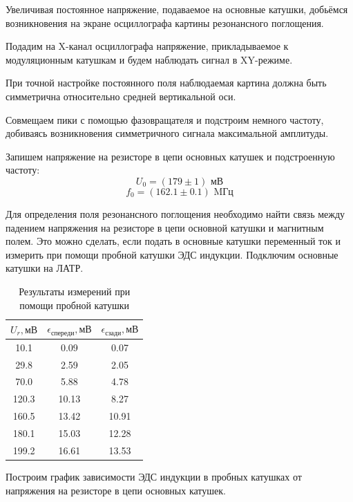\documentclass[a4paper, 12pt]{article}
\begin{document}
        Увеличивая постоянное напряжение, подаваемое на основные катушки, добьёмся возникновения на экране осциллографа картины резонансного поглощения.

        Подадим на X-канал осциллографа напряжение, прикладываемое к модуляционным катушкам и будем наблюдать сигнал в XY-режиме.

        При точной настройке постоянного поля наблюдаемая картина должна быть симметрична относительно средней вертикальной оси.

        Совмещаем пики с помощью фазовращателя и подстроим немного частоту, добиваясь возникновения симметричного сигнала максимальной амплитуды.

        Запишем напряжение на резисторе в цепи основных катушек и подстроенную частоту:
        \[ U_0 = (179 \pm 1) \text{ мВ} \]
        \[ f_0 = (162.1 \pm 0.1) \text{ MГц} \]

        Для определения поля резонансного поглощения необходимо найти связь между падением напряжения на резисторе в цепи основной катушки и магнитным полем.
        Это можно сделать, если подать в основные катушки переменный ток и измерить при помощи пробной катушки ЭДС индукции. Подключим основные катушки на ЛАТР.

        \begin{table}[!ht]
            \centering
            \begin{tabular}{|c|c|c|}
                \hline

                $U_r, мВ$ & $\epsilon_{спереди}, мВ$ & $\epsilon_{сзади}, мВ$\\ \hline
                10.1 & 0.09 & 0.07\\ \hline
                29.8 & 2.59 & 2.05\\ \hline
                70.0 & 5.88 & 4.78\\ \hline
                120.3 & 10.13 & 8.27\\ \hline
                160.5 & 13.42 & 10.91\\ \hline
                180.1 & 15.03 & 12.28\\ \hline
                199.2 & 16.61 & 13.53\\ \hline

            \end{tabular}
            \caption{Результаты измерений при помощи пробной катушки}
            \label{}
        \end{table}

        Построим график зависимости ЭДС индукции в пробных катушках от напряжения на резисторе в цепи основных катушек.
\end{document}
